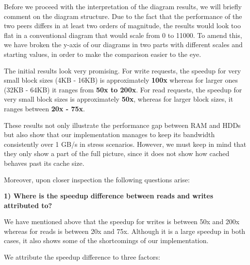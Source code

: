 Before we proceed with the interpretation of the diagram results, we will 
briefly comment on the diagram structure. Due to the fact that the performance 
of the two peers differs in at least two orders of magnitude, the results would 
look too flat in a conventional diagram that would scale from 0 to 11000. To 
amend this, we have broken the y-axis of our diagrams in two parts with 
different scales and starting values, in order to make the comparison easier to 
the eye.


The initial results look very promising. For write requests, the speedup for 
very small block sizes (4KB - 16KB) is approximately \textbf{100x} whereas for 
larger ones (32KB - 64KB) it ranges from \textbf{50x to 200x}. For read 
requests, the speedup for very small block sizes is approximately \textbf{50x}, 
whereas for larger block sizes, it ranges between \textbf{20x - 75x}.

These results not only illustrate the performance gap between RAM and
HDDs but also show that our implementation manages to keep its bandwidth 
consistently over 1 GB/s in stress scenarios. However, we must keep in mind 
that they only show a part of the full picture, since it does not show how 
cached behaves past its cache size.

Moreover, upon closer inspection the following questions arise:

\textbf{1) Where is the speedup difference between reads and writes attributed 
	to?}

We have mentioned above that the speedup for writes is between 50x and 200x 
whereas for reads is between 20x and 75x. Although it is a large speedup in 
both cases, it also shows some of the shortcomings of our implementation.

We attribute the speedup difference to three factors:

